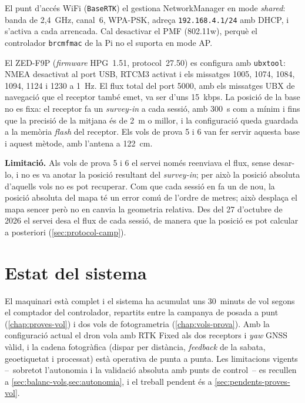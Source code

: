 El punt d'accés WiFi (\texttt{BaseRTK}) el gestiona NetworkManager en mode \emph{shared}: banda de 2,4~GHz, canal~6, WPA-PSK, adreça \texttt{192.168.4.1/24} amb DHCP, i s'activa a cada arrencada. Cal desactivar el PMF (802.11w), perquè el controlador \texttt{brcmfmac} de la Pi no el suporta en mode AP.

El ZED-F9P (\emph{firmware} HPG~1.51, protocol~27.50) es configura amb \texttt{ubxtool}: NMEA desactivat al port USB, RTCM3 activat i els missatges 1005, 1074, 1084, 1094, 1124 i 1230 a 1~Hz. El flux total del port 5000, amb els missatges UBX de navegació que el receptor també emet, va ser d'uns 15~kbps. La posició de la base no es fixa: el receptor fa un \emph{survey-in} a cada sessió, amb 300~s com a mínim i fins que la precisió de la mitjana és de 2~m o millor, i la configuració queda guardada a la memòria \emph{flash} del receptor. Els vols de prova 5 i 6 van fer servir aquesta base i aquest mètode, amb l'antena a 122~cm.

\textbf{Limitació.} Als vols de prova 5 i 6 el servei només reenviava el flux, sense desar-lo, i no es va anotar la posició resultant del \emph{survey-in}; per això la posició absoluta d'aquells vols no es pot recuperar. Com que cada sessió en fa un de nou, la posició absoluta del mapa té un error comú de l'ordre de metres; això desplaça el mapa sencer però no en canvia la geometria relativa. Des del 27 d'octubre de 2026 el servei desa el flux de cada sessió, de manera que la posició es pot calcular a posteriori (\cref{sec:protocol-camp}).

\section{Estat del sistema}
\label{sec:estat-actual}

El maquinari està complet i el sistema ha acumulat uns 30~minuts de vol segons el comptador del controlador, repartits entre la campanya de posada a punt (\cref{chap:proves-vol}) i dos vols de fotogrametria (\cref{chap:vols-prova}). Amb la configuració actual el dron vola amb RTK Fixed als dos receptors i \emph{yaw} GNSS vàlid, i la cadena fotogràfica (dispar per distància, \emph{feedback} de la sabata, geoetiquetat i processat) està operativa de punta a punta. Les limitacions vigents --~sobretot l'autonomia i la validació absoluta amb punts de control~-- es recullen a \cref{sec:balanc-vols,sec:autonomia}, i el treball pendent és a \cref{sec:pendents-proves-vol}.
